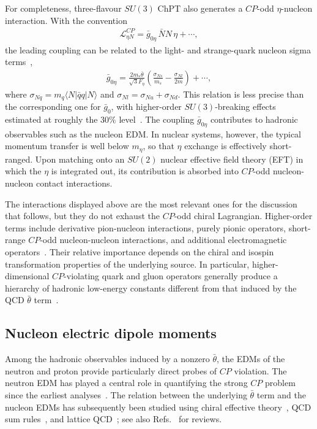 \documentclass[review]{elsarticle}
\numberwithin{equation}{section}
\numberwithin{table}{section}
\numberwithin{figure}{section}
\begin{document}
For completeness, three-flavour $SU(3)$ ChPT also generates a $CP$-odd $\eta$-nucleon interaction. With the convention
\begin{align}
\mathcal{L}^{CP}_{\eta N}
=
\bar g_{0\eta}\,\bar N N\,\eta+\cdots ,
\end{align}
the leading coupling can be related to the light- and strange-quark nucleon sigma terms~\cite{deVries:2015una},
\begin{align}
    \bar g_{0\eta} = \frac{2m_*\bar\theta}{\sqrt{3}F_\eta} \left( \frac{\sigma_{Ns}}{m_s} - \frac{\sigma_{Nl}}{2\bar m} \right) +\cdots ,
    \label{eq:g0eta}
\end{align}
where $\sigma_{Nq}=m_q\langle N|\bar q q|N\rangle$ and $\sigma_{Nl}=\sigma_{Nu}+\sigma_{Nd}$. This relation is less precise than the corresponding one for $\bar g_0$, with higher-order $SU(3)$-breaking effects estimated at roughly the $30\%$ level~\cite{deVries:2015una}. The coupling $\bar g_{0\eta}$ contributes to hadronic observables such as the nucleon EDM. In nuclear systems, however, the typical momentum transfer is well below $m_\eta$, so that $\eta$ exchange is effectively short-ranged. Upon matching onto an $SU(2)$ nuclear effective field theory (EFT) in which the $\eta$ is integrated out, its contribution is absorbed into $CP$-odd nucleon-nucleon contact interactions. 

The interactions displayed above are the most relevant ones for the discussion that follows, but they do not exhaust the $CP$-odd chiral Lagrangian. Higher-order terms include derivative pion-nucleon interactions, purely pionic operators, short-range $CP$-odd nucleon-nucleon interactions, and additional electromagnetic operators~\cite{Mereghetti:2010tp,deVries:2012ab,Bsaisou:2014oka}. Their relative importance depends on the chiral and isospin transformation properties of the underlying source. In particular, higher-dimensional $CP$-violating quark and gluon operators generally produce a hierarchy of hadronic low-energy constants different from that induced by the QCD $\bar\theta$ term~\cite{deVries:2012ab,Bsaisou:2014oka,Pospelov:2025vzj}.


\subsection{Nucleon electric dipole moments}
\label{sec:nucleon-EDMs}

Among the hadronic observables induced by a nonzero $\bar\theta$, the EDMs of the neutron and proton provide particularly direct probes of $CP$ violation. The neutron EDM has played a central role in quantifying the strong $CP$ problem since the earliest analyses~\cite{Baluni:1978rf,Crewther:1979pi}. The relation between the underlying $\bar\theta$ term and the nucleon EDMs has subsequently been studied using chiral effective theory~\cite{Pich:1991fq,Borasoy:2000pq,Hockings:2005cn,Ottnad:2009jw,Mereghetti:2010kp,Guo:2012vf}, QCD sum rules~\cite{Narison:2008jp}, and lattice QCD~\cite{Dragos:2019oxn,Liang:2023jfj,Blum:2026hul}; see also Refs.~\cite{Pospelov:2005pr,Engel:2013lsa,Liu:2024kqy,Pospelov:2025vzj} for reviews.
\end{document}
